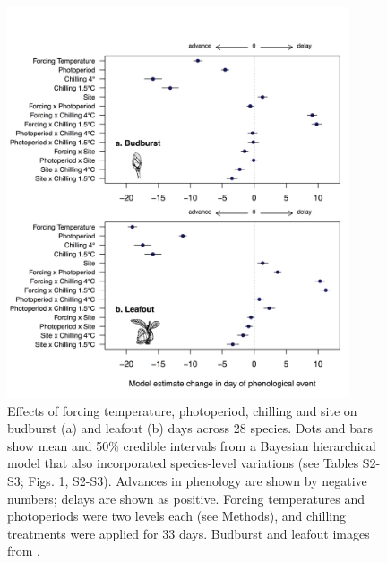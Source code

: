 \documentclass[11pt]{article}
\begin{document}
\begin{figure}[h!]
\centering
\noindent \includegraphics[width=0.9\textwidth]{images/Fig1_bb_lo.png}
\caption{Effects of forcing temperature, photoperiod, chilling and site on budburst (a) and leafout (b) days across 28 species. Dots and bars show mean and 50\% credible intervals from a Bayesian hierarchical model that also incorporated species-level variations (see Tables S2-S3; Figs. 1, S2-S3). Advances in phenology are shown by negative numbers; delays are shown as positive. Forcing temperatures and photoperiods were two levels each (see Methods), and chilling treatments were applied for 33 days. Budburst and leafout images from \citet{Finn:2007}.}
\label{fig:maineff}
\end{figure}
\end{document}
